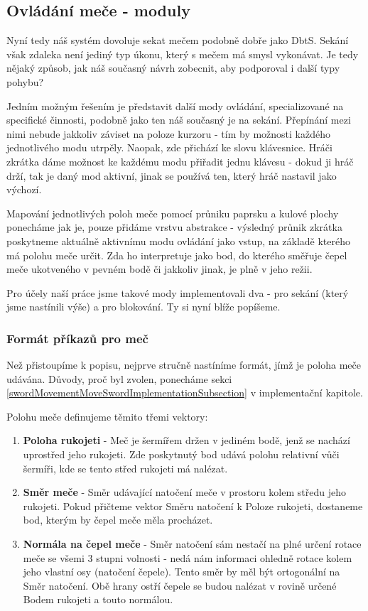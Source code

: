 \pagebreak

\subsection{Ovládání meče - moduly}

Nyní tedy náš systém dovoluje sekat mečem podobně dobře jako \acl{DbtS}. Sekání však zdaleka není jediný typ úkonu, který s mečem má smysl vykonávat. Je tedy nějaký způsob, jak náš současný návrh zobecnit, aby podporoval i další typy pohybu?

Jedním možným řešením je představit další mody ovládání, specializované na specifické činnosti, podobně jako ten náš současný je na sekání. Přepínání mezi nimi nebude jakkoliv záviset na poloze kurzoru - tím by možnosti každého jednotlivého modu utrpěly. Naopak, zde přichází ke slovu klávesnice. Hráči zkrátka dáme možnost ke každému modu přiřadit jednu klávesu - dokud ji hráč drží, tak je daný mod aktivní, jinak se používá ten, který hráč nastavil jako výchozí.

Mapování jednotlivých poloh meče pomocí průniku paprsku a kulové plochy ponecháme jak je, pouze přidáme vrstvu abstrakce - výsledný průnik zkrátka poskytneme aktuálně aktivnímu modu ovládání jako vstup, na základě kterého má polohu meče určit. Zda ho interpretuje jako bod, do kterého směřuje čepel meče ukotveného v pevném bodě či jakkoliv jinak, je plně v jeho režii.

Pro účely naší práce jsme takové mody implementovali dva - pro sekání (který jsme nastínili výše) a pro blokování. Ty si nyní blíže popíšeme.

\subsubsection*{Formát příkazů pro meč}

Než přistoupíme k popisu, nejprve stručně nastíníme formát, jímž je poloha meče udávána. Důvody, proč byl zvolen, ponecháme sekci \ref{swordMovementMoveSwordImplementationSubsection} v implementační kapitole.

Polohu meče definujeme těmito třemi vektory:
\begin{enumerate}
    \item \textbf{Poloha rukojeti} - Meč je šermířem držen v jediném bodě, jenž se nachází uprostřed jeho rukojeti. Zde poskytnutý bod udává polohu relativní vůči šermíři, kde se tento střed rukojeti má nalézat.
    \item \textbf{Směr meče} - Směr udávající natočení meče v prostoru kolem středu jeho rukojeti. Pokud přičteme vektor Směru natočení k Poloze rukojeti, dostaneme bod, kterým by čepel meče měla procházet.
    \item \textbf{Normála na čepel meče} - Směr natočení sám nestačí na plné určení rotace meče se všemi 3 stupni volnosti - nedá nám informaci ohledně rotace kolem jeho vlastní osy (natočení čepele). Tento směr by měl být ortogonální na Směr natočení. Obě hrany ostří čepele se budou nalézat v rovině určené Bodem rukojeti a touto normálou.   
\end{enumerate}

